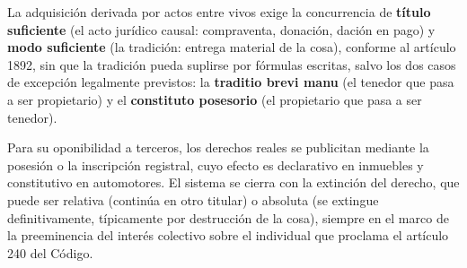 \documentclass[12pt,oneside]{book}
\begin{document}
La adquisición derivada por actos entre vivos exige la concurrencia de \textbf{título suficiente} (el acto jurídico causal: compraventa, donación, dación en pago) y \textbf{modo suficiente} (la tradición: entrega material de la cosa), conforme al artículo 1892, sin que la tradición pueda suplirse por fórmulas escritas, salvo los dos casos de excepción legalmente previstos: la \textbf{traditio brevi manu} (el tenedor que pasa a ser propietario) y el \textbf{constituto posesorio} (el propietario que pasa a ser tenedor).

Para su oponibilidad a terceros, los derechos reales se publicitan mediante la posesión o la inscripción registral, cuyo efecto es declarativo en inmuebles y constitutivo en automotores. El sistema se cierra con la extinción del derecho, que puede ser relativa (continúa en otro titular) o absoluta (se extingue definitivamente, típicamente por destrucción de la cosa), siempre en el marco de la preeminencia del interés colectivo sobre el individual que proclama el artículo 240 del Código.
\end{document}
